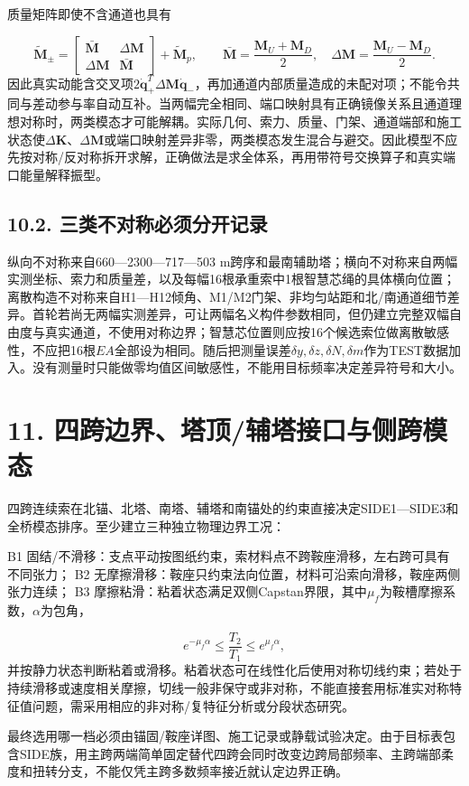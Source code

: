 \documentclass[UTF8,a4paper,11pt,fontset=none]{ctexart}
\begin{document}
质量矩阵即使不含通道也具有\par
\[
\widetilde{\mathbf M}_{\pm}=
\begin{bmatrix}
\bar{\mathbf M}&\Delta\mathbf M\\
\Delta\mathbf M&\bar{\mathbf M}
\end{bmatrix}
+\widetilde{\mathbf M}_{p},
\qquad
\bar{\mathbf M}=\frac{\mathbf M_U+\mathbf M_D}{2},
\quad
\Delta\mathbf M=\frac{\mathbf M_U-\mathbf M_D}{2}.
\]
因此真实动能含交叉项\(2\dot{\mathbf q}_{+}^{T}\Delta\mathbf M\dot{\mathbf q}_{-}\)\allowbreak{}，再加通道内部质量造成的未配对项；不能令共同与差动参与率自动互补。当两幅完全相同、端口映射具有正确镜像关系且通道理想对称时，两类模态才可能解耦。实际几何、索力、质量、门架、通道端部和施工状态使\(\Delta\mathbf K\)\allowbreak{}、\(\Delta\mathbf M\)\allowbreak{}或端口映射差异非零，两类模态发生混合与避交。因此模型不应先按对称/反对称拆开求解，正确做法是求全体系，再用带符号交换算子和真实端口能量解释振型。\par
{}
\subsection*{10.2. 三类不对称必须分开记录}
纵向不对称来自660—2300—717—503 m跨序和最南辅助塔；横向不对称来自两幅实测坐标、索力和质量差，以及每幅16根承重索中1根智慧芯绳的具体横向位置；离散构造不对称来自H1—H12倾角、M1/M2门架、非均匀站距和北/南通道细节差异。首轮若尚无两幅实测差异，可让两幅名义构件参数相同，但仍建立完整双幅自由度与真实通道，不使用对称边界；智慧芯位置则应按16个候选索位做离散敏感性，不应把16根\(EA\)\allowbreak{}全部设为相同。随后把测量误差\(\delta y,\allowbreak \delta z,\allowbreak \delta N,\allowbreak \delta m\)\allowbreak{}作为TEST数据加入。没有测量时只能做零均值区间敏感性，不能用目标频率决定差异符号和大小。\par
{}
\section*{11. 四跨边界、塔顶/辅塔接口与侧跨模态}
四跨连续索在北锚、北塔、南塔、辅塔和南锚处的约束直接决定SIDE1—SIDE3和全桥模态排序。至少建立三种独立物理边界工况：\par
B1 固结/不滑移：支点平动按图纸约束，索材料点不跨鞍座滑移，左右跨可具有不同张力； B2 无摩擦滑移：鞍座只约束法向位置，材料可沿索向滑移，鞍座两侧张力连续； B3 摩擦粘滑：粘着状态满足双侧Capstan界限，其中\(\mu_f\)\allowbreak{}为鞍槽摩擦系数，\(\alpha\)\allowbreak{}为包角，\par
\[
e^{-\mu_f\alpha}
\leq\frac{T_2}{T_1}
\leq e^{\mu_f\alpha},
\]
并按静力状态判断粘着或滑移。粘着状态可在线性化后使用对称切线约束；若处于持续滑移或速度相关摩擦，切线一般非保守或非对称，不能直接套用标准实对称特征值问题，需采用相应的非对称/复特征分析或分段状态研究。\par
最终选用哪一档必须由锚固/鞍座详图、施工记录或静载试验决定。由于目标表包含SIDE族，用主跨两端简单固定替代四跨会同时改变边跨局部频率、主跨端部柔度和扭转分支，不能仅凭主跨多数频率接近就认定边界正确。\par
{}
\end{document}
